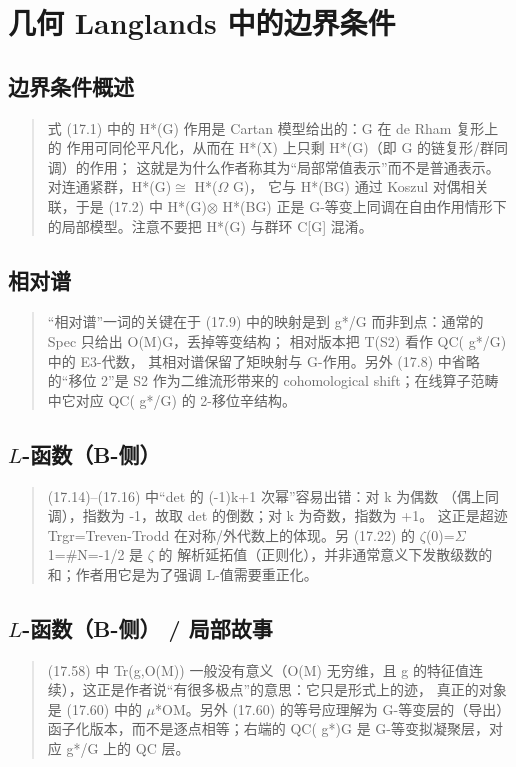 \section{几何 Langlands 中的边界条件}
\subsection*{边界条件概述}
\begin{quote}\small
式 (17.1) 中的 H*(G) 作用是 Cartan 模型给出的：G 在 de Rham 复形上的 作用可同伦平凡化，从而在 H*(X) 上只剩 H*(G)（即 G 的链复形/群同调）的作用； 这就是为什么作者称其为“局部常值表示”而不是普通表示。对连通紧群，H*(G)$\cong$ H*($\Omega$ G)， 它与 H*(BG) 通过 Koszul 对偶相关联，于是 (17.2) 中 H*(G)$\otimes$ H*(BG) 正是 G-等变上同调在自由作用情形下的局部模型。注意不要把 H*(G) 与群环 C[G] 混淆。
\end{quote}

\subsection*{相对谱}
\begin{quote}\small
“相对谱”一词的关键在于 (17.9) 中的映射是到 g*/G 而非到点：通常的 Spec 只给出 O(M)G，丢掉等变结构； 相对版本把 T(S2) 看作 QC( g*/G) 中的 E3-代数， 其相对谱保留了矩映射与 G-作用。另外 (17.8) 中省略的“移位 2”是 S2 作为二维流形带来的 cohomological shift；在线算子范畴中它对应 QC( g*/G) 的 2-移位辛结构。
\end{quote}

\subsection*{$L$-函数（B-侧）}
\begin{quote}\small
(17.14)--(17.16) 中“det 的 (-1)k+1 次幂”容易出错：对 k 为偶数 （偶上同调），指数为 -1，故取 det 的倒数；对 k 为奇数，指数为 +1。 这正是超迹 Trgr=Treven-Trodd 在对称/外代数上的体现。另 (17.22) 的 $\zeta$(0)=$\Sigma$ 1=\#N=-1/2 是 $\zeta$ 的 解析延拓值（正则化），并非通常意义下发散级数的和；作者用它是为了强调 L-值需要重正化。
\end{quote}

\subsection*{$L$-函数（B-侧） / 局部故事}
\begin{quote}\small
(17.58) 中 Tr(g,O(M)) 一般没有意义（O(M) 无穷维，且 g 的特征值连续），这正是作者说“有很多极点”的意思：它只是形式上的迹， 真正的对象是 (17.60) 中的 $\mu$*OM。另外 (17.60) 的等号应理解为 G-等变层的（导出）函子化版本，而不是逐点相等；右端的 QC( g*)G 是 G-等变拟凝聚层，对应 g*/G 上的 QC 层。
\end{quote}

